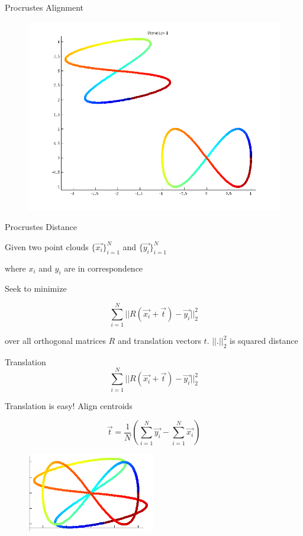 \documentclass{beamer}
\begin{document}
\begin{frame}{Procrustes Alignment}

\begin{figure}[t]
	\centering
    \includegraphics[width=\textwidth]{ProcrustesEx1.png}
\end{figure}

\end{frame}


\begin{frame}{Procrustes Distance}

Given two point clouds $\{\vec{x_i}\}_{i=1}^N$ and $\{\vec{y_i}\}_{i=1}^N$

where $x_i$ and $y_i$ are in correspondence

Seek to minimize

\[ \sum_{i=1}^N ||R(\vec{x_i} + \vec{t}) - \vec{y_i}||_2^2 \]

over all orthogonal matrices $R$ and translation vectors $t$.  $||.||^2_2$ is squared distance

\end{frame}


\begin{frame}{Translation}
\[ \sum_{i=1}^N ||R(\vec{x_i} + \vec{t}) - \vec{y_i}||_2^2 \]

Translation is easy! Align centroids


\[ \vec{t} = \frac{1}{N} \left(\sum_{i=1}^N \vec{y_i} - \sum_{i=1}^N \vec{x_i} \right) \]

\begin{figure}[t]
	\centering
    \includegraphics[width=0.5\textwidth]{ProcrustesEx1Translated.png}
\end{figure}


\end{frame}
\end{document}
